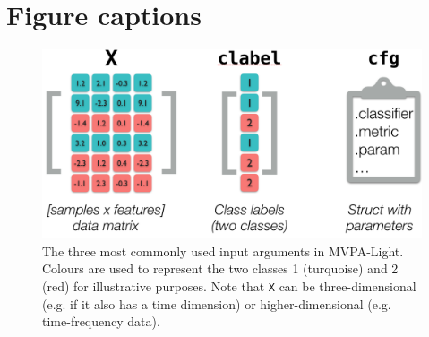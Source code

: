 \documentclass[utf8]{frontiersSCNS} %
\newcommand{\mvpa}{MVPA-Light}
\newcommand{\ttt}[1]{\texttt{#1}}
\begin{document}



\section*{Figure captions}


\begin{figure}[ht!]
\centering\includegraphics[width=.6\linewidth]{X_clabel_cfg}
\caption{The three most commonly used input arguments in \mvpa. Colours are used to represent the two classes 1 (turquoise) and 2 (red) for illustrative purposes. Note that \ttt{X} can be  three-dimensional (e.g. if it also has a time dimension) or higher-dimensional (e.g. time-frequency data).}\label{fig:X}
\end{figure}


\end{document}
